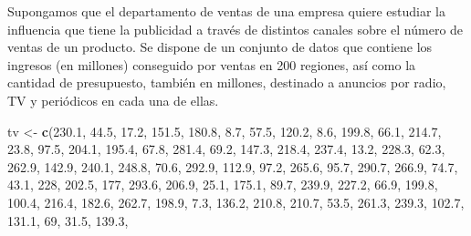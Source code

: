 \documentclass[]{book}
\newenvironment{Shaded}{\begin{snugshade}}{\end{snugshade}}
\newcommand{\KeywordTok}[1]{\textcolor[rgb]{0.13,0.29,0.53}{\textbf{#1}}}
\newcommand{\DecValTok}[1]{\textcolor[rgb]{0.00,0.00,0.81}{#1}}
\newcommand{\FloatTok}[1]{\textcolor[rgb]{0.00,0.00,0.81}{#1}}
\newcommand{\StringTok}[1]{\textcolor[rgb]{0.31,0.60,0.02}{#1}}
\newcommand{\NormalTok}[1]{#1}
\begin{document}
Supongamos que el departamento de ventas de una empresa quiere estudiar
la influencia que tiene la publicidad a través de distintos canales
sobre el número de ventas de un producto. Se dispone de un conjunto de
datos que contiene los ingresos (en millones) conseguido por ventas en
200 regiones, así como la cantidad de presupuesto, también en millones,
destinado a anuncios por radio, TV y periódicos en cada una de ellas.

\begin{Shaded}
\begin{Highlighting}[]
\NormalTok{tv <-}\StringTok{ }\KeywordTok{c}\NormalTok{(}\FloatTok{230.1}\NormalTok{, }\FloatTok{44.5}\NormalTok{, }\FloatTok{17.2}\NormalTok{, }\FloatTok{151.5}\NormalTok{, }\FloatTok{180.8}\NormalTok{, }\FloatTok{8.7}\NormalTok{, }\FloatTok{57.5}\NormalTok{, }\FloatTok{120.2}\NormalTok{, }\FloatTok{8.6}\NormalTok{, }\FloatTok{199.8}\NormalTok{, }\FloatTok{66.1}\NormalTok{, }
    \FloatTok{214.7}\NormalTok{, }\FloatTok{23.8}\NormalTok{, }\FloatTok{97.5}\NormalTok{, }\FloatTok{204.1}\NormalTok{, }\FloatTok{195.4}\NormalTok{, }\FloatTok{67.8}\NormalTok{, }\FloatTok{281.4}\NormalTok{, }\FloatTok{69.2}\NormalTok{, }\FloatTok{147.3}\NormalTok{, }\FloatTok{218.4}\NormalTok{, }\FloatTok{237.4}\NormalTok{, }
    \FloatTok{13.2}\NormalTok{, }\FloatTok{228.3}\NormalTok{, }\FloatTok{62.3}\NormalTok{, }\FloatTok{262.9}\NormalTok{, }\FloatTok{142.9}\NormalTok{, }\FloatTok{240.1}\NormalTok{, }\FloatTok{248.8}\NormalTok{, }\FloatTok{70.6}\NormalTok{, }\FloatTok{292.9}\NormalTok{, }\FloatTok{112.9}\NormalTok{, }\FloatTok{97.2}\NormalTok{, }
    \FloatTok{265.6}\NormalTok{, }\FloatTok{95.7}\NormalTok{, }\FloatTok{290.7}\NormalTok{, }\FloatTok{266.9}\NormalTok{, }\FloatTok{74.7}\NormalTok{, }\FloatTok{43.1}\NormalTok{, }\DecValTok{228}\NormalTok{, }\FloatTok{202.5}\NormalTok{, }\DecValTok{177}\NormalTok{, }\FloatTok{293.6}\NormalTok{, }\FloatTok{206.9}\NormalTok{, }\FloatTok{25.1}\NormalTok{, }
    \FloatTok{175.1}\NormalTok{, }\FloatTok{89.7}\NormalTok{, }\FloatTok{239.9}\NormalTok{, }\FloatTok{227.2}\NormalTok{, }\FloatTok{66.9}\NormalTok{, }\FloatTok{199.8}\NormalTok{, }\FloatTok{100.4}\NormalTok{, }\FloatTok{216.4}\NormalTok{, }\FloatTok{182.6}\NormalTok{, }\FloatTok{262.7}\NormalTok{, }\FloatTok{198.9}\NormalTok{, }
    \FloatTok{7.3}\NormalTok{, }\FloatTok{136.2}\NormalTok{, }\FloatTok{210.8}\NormalTok{, }\FloatTok{210.7}\NormalTok{, }\FloatTok{53.5}\NormalTok{, }\FloatTok{261.3}\NormalTok{, }\FloatTok{239.3}\NormalTok{, }\FloatTok{102.7}\NormalTok{, }\FloatTok{131.1}\NormalTok{, }\DecValTok{69}\NormalTok{, }\FloatTok{31.5}\NormalTok{, }\FloatTok{139.3}\NormalTok{, }

\end{Highlighting}
\end{Shaded}
\end{document}
